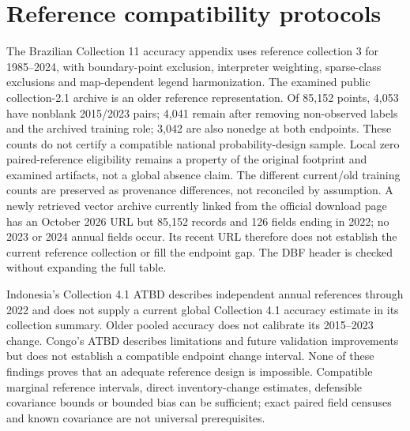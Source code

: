 \section{Reference compatibility protocols}
The Brazilian Collection 11 accuracy appendix uses reference collection 3 for 1985--2024, with boundary-point exclusion, interpreter weighting, sparse-class exclusions and map-dependent legend harmonization. The examined public collection-2.1 archive is an older reference representation. Of 85,152 points, 4,053 have nonblank 2015/2023 pairs; 4,041 remain after removing non-observed labels and the archived training role; 3,042 are also nonedge at both endpoints. These counts do not certify a compatible national probability-design sample. Local zero paired-reference eligibility remains a property of the original footprint and examined artifacts, not a global absence claim. The different current/old training counts are preserved as provenance differences, not reconciled by assumption. A newly retrieved vector archive currently linked from the official download page has an October 2026 URL but 85,152 records and 126 fields ending in 2022; no 2023 or 2024 annual fields occur. Its recent URL therefore does not establish the current reference collection or fill the endpoint gap. The DBF header is checked without expanding the full table.

Indonesia's Collection 4.1 ATBD describes independent annual references through 2022 and does not supply a current global Collection 4.1 accuracy estimate in its collection summary. Older pooled accuracy does not calibrate its 2015--2023 change. Congo's ATBD describes limitations and future validation improvements but does not establish a compatible endpoint change interval. None of these findings proves that an adequate reference design is impossible. Compatible marginal reference intervals, direct inventory-change estimates, defensible covariance bounds or bounded bias can be sufficient; exact paired field censuses and known covariance are not universal prerequisites.

